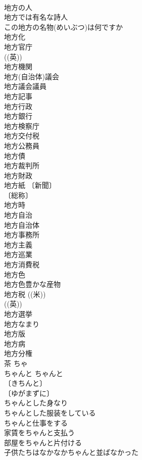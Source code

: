 \documentclass[8pt]{extreport}
\begin{document}
\begin{CJK}{UTF8}{min}
\\	地方の人 
\\	地方では有名な詩人 
\\	この地方の名物(めいぶつ)は何ですか 
\\	地方化 
\\	地方官庁 
\\	((英)) 
\\	地方機関 
\\	地方(自治体)議会 
\\	地方議会議員 
\\	地方記事 
\\	地方行政 
\\	地方銀行 
\\	地方検察庁 
\\	地方交付税 
\\	地方公務員 
\\	地方債 
\\	地方裁判所 
\\	地方財政 
\\	地方紙 〔新聞〕
\\	〔総称〕
\\	地方時 
\\	地方自治 
\\	地方自治体 
\\	地方事務所 
\\	地方主義 
\\	地方巡業 
\\	地方消費税 
\\	地方色 
\\	地方色豊かな産物 
\\	地方税 ((米)) 
\\	((英)) 
\\	地方選挙 
\\	地方なまり 
\\	地方版 
\\	地方病 
\\	地方分権 
\\	茶	ちゃ	
\\	ちゃんと	ちゃんと	
\\	〔きちんと〕
\\	〔ゆがまずに〕
\\	ちゃんとした身なり 
\\	ちゃんとした服装をしている 
\\	ちゃんと仕事をする 
\\	家賃をちゃんと支払う 
\\	部屋をちゃんと片付ける 
\\	子供たちはなかなかちゃんと並ばなかった 

\end{CJK}
\end{document}
